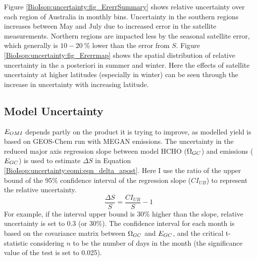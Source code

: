     
    Figure \ref{BioIsop:uncertainty:fig_ErerrSummary} shows relative uncertainty over each region of Australia in monthly bins.
    Uncertainty in the southern regions increases between May and July due to increased error in the satellite measurements.
    Northern regions are impacted less by the seasonal satellite error, which generally is $10-20~\%$ lower than the error from $S$.
    Figure \ref{BioIsop:uncertainty:fig_Ererrmap} shows the spatial distribution of relative uncertainty in the a posteriori in summer and winter.
    Here the effects of satellite uncertainty at higher latitudes (especially in winter) can be seen through the increase in uncertainty with increasing latitude.
    
    
    
    
  \subsection{Model Uncertainty}
    \label{BioIsop:uncertainty:Model}
    
    $E_{OMI}$ depends partly on the product it is trying to improve, as modelled yield is based on GEOS-Chem run with MEGAN emissions.
    The uncertainty in the reduced major axis regression slope between model HCHO ($\Omega_{GC}$) and emissions ($E_{GC}$) is used to estimate $\Delta S$ in Equation \ref{BioIsop:uncertainty:eomi:eqn_delta_apost}.
    Here I use the ratio of the upper bound of the 95\% confidence interval of the regression slope ($CI_{UB}$) to represent the relative uncertainty.
    \begin{equation}
      \frac{\Delta S}{S} = \frac{CI_{UB}}{S} - 1
    \end{equation}
    For example, if the interval upper bound is 30\% higher than the slope, relative uncertainty is set to 0.3 (or 30\%).
    The confidence interval for each month is based on the covariance matrix between $\Omega_{GC}$ and $E_{GC}$, and the critical t-statistic considering $n$ to be the number of days in the month (the significance value of the test is set to 0.025).
    
